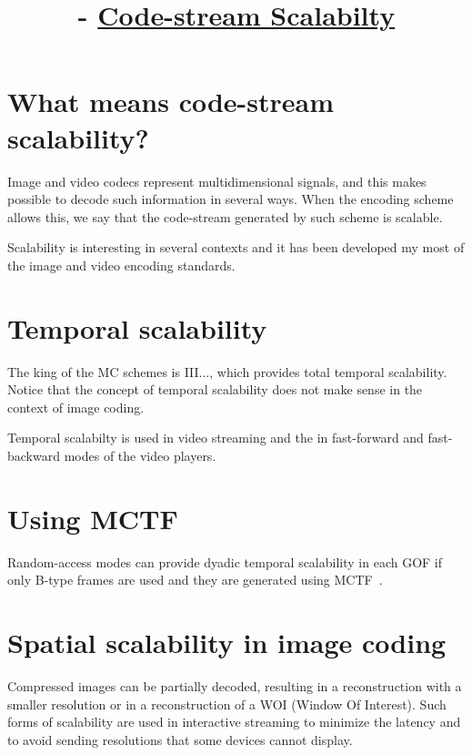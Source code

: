 


\title{\SM{} -  \href{https://github.com/Sistemas-Multimedia/Sistemas-Multimedia.github.io/tree/master/contents/data_scalability}{Code-stream Scalabilty}}

\maketitle
\tableofcontents

\section{What means code-stream scalability?}

Image and video codecs represent multidimensional signals, and this
makes possible to decode such information in several ways. When the
encoding scheme allows this, we say that the code-stream generated by
such scheme is scalable.

Scalability is interesting in several contexts and it has been
developed my most of the image and video encoding standards.

\section{Temporal scalability}

The king of the MC schemes is III..., which provides total temporal
scalability. Notice that the concept of temporal scalability does not
make sense in the context of image coding.

Temporal scalabilty is used in video streaming and the in fast-forward
and fast-backward modes of the video players.

\section{Using MCTF}

Random-access modes can provide dyadic temporal scalability in each
GOF if only B-type frames are used and they are generated using
MCTF~\cite{vruiz__MCTF}.

\section{Spatial scalability in image coding}

Compressed images can be partially decoded, resulting in a
reconstruction with a smaller resolution or in a reconstruction of a
WOI (Window Of Interest). Such forms of scalability are used in
interactive streaming to minimize the latency and to avoid sending
resolutions that some devices cannot display.

